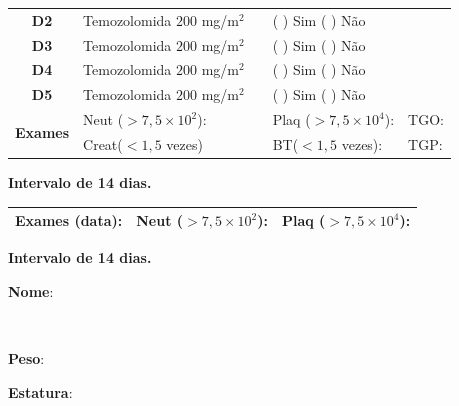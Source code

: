 \documentclass[11pt,a4paper,oldfontcommands]{memoir}
\def\entrywithlabel[#1]#2{\parbox{#1}{{\small #2:} \hrulefill}}
\begin{document}
\begin{center}
\begin{table}[H]
\begin{tabular}{p{1cm}p{5cm}|p{1cm}|p{4.5cm}|p{2cm}}
    \multicolumn{1}{c|}{\multirow{1}{*}{\textbf{D2}}}&{Temozolomida \(200\) mg/m\(^2\)}&&{(  ) Sim (  ) Não}&\\
    \multicolumn{1}{c|}{\multirow{1}{*}{\textbf{D3}}}&{Temozolomida \(200\) mg/m\(^2\)}&&{(  ) Sim (  ) Não}&\\
    \multicolumn{1}{c|}{\multirow{1}{*}{\textbf{D4}}}&{Temozolomida \(200\) mg/m\(^2\)}&&{(  ) Sim (  ) Não}&\\
    \multicolumn{1}{c|}{\multirow{1}{*}{\textbf{D5}}}&{Temozolomida \(200\) mg/m\(^2\)}&&{(  ) Sim (  ) Não}&\\
    \hline
    \multicolumn{1}{c|}{\multirow{2}{*}{\textbf{Exames}}}&\multicolumn{2}{l|}{Neut (\(>7,5\times10^2\)):}&{Plaq (\(>7,5\times10^4\)):}&{TGO:}\\
    \cline{2-5}
    \multicolumn{1}{c|}{\multirow{2}{*}{{}}}&\multicolumn{2}{l|}{Creat(\(<1,5\) vezes)}&{BT(\(<1,5\) vezes):}&{TGP:}
    \\
    \hline
\end{tabular}
\end{table}
\textbf{Intervalo de 14 dias.}
\begin{table}[H]
\begin{tabular}{p{5cm}|p{5cm}|p{4.7cm}}
    \hline
    \textbf{Exames (data):}&{Neut (\(>7,5\times10^2\)):}&{Plaq (\(>7,5\times10^4\)):}
    \\
    \hline
\end{tabular}
\end{table}
\textbf{Intervalo de 14 dias.}


\pagebreak
    \noindent
\entrywithlabel[1\hsize]{\textbf{Nome}}\hfill
\\[0.3cm]
\entrywithlabel[.45\hsize]{\textbf{Peso}}\hfill  \entrywithlabel[.45\hsize]{\textbf{Estatura}}


\end{center}
\end{document}
